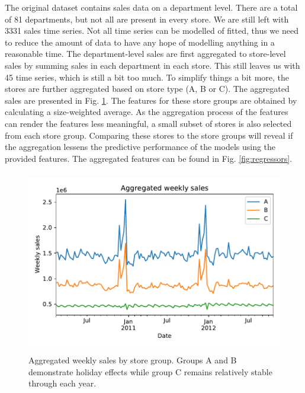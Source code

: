 \documentclass[english, 12pt, a4paper, sci, utf8, a-1b, online]{aaltothesis}
\begin{document}

The original dataset contains sales data on a department level. There are a total of 81 departments, but not all are present in every store. We are still left with 3331 sales time series. Not all time series can be modelled of fitted, thus we need to reduce the amount of data to have any hope of modelling anything in a reasonable time. The department-level sales are first aggregated to store-level sales by summing sales in each department in each store. This still leaves us with 45 time series, which is still a bit too much. To simplify things a bit more, the stores are further aggregated based on store type (A, B or C). The aggregated sales are presented in Fig. \ref{fig:data_y}. The features for these store groups are obtained by calculating a size-weighted average. As the aggregation process of the features can render the features less meaningful, a small subset of stores is also selected from each store group. Comparing these stores to the store groups will reveal if the aggregation lessens the predictive performance of the models using the provided features. The aggregated features can be found in Fig. \ref{fig:regressors}.

\begin{figure}[htb]
	\centering
	\includegraphics[height=8cm]{../plots/dataset/dataset_plot_y.pdf}
	\caption{Aggregated weekly sales by store group. Groups A and B demonstrate holiday effects while group C remains relatively stable through each year.
	}
	\label{fig:data_y}
\end{figure}
\end{document}

